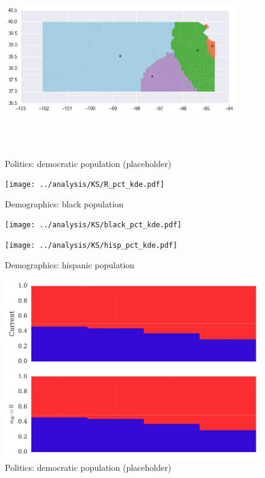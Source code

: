 \begin{figure}[htb!]
\includegraphics[width=4in,height=3in,keepaspectratio]{../maps/KS/static/0_25_after.png}
\end{figure}

\clearpage
\newpage

\begin{figure}[htb!] \centering
\caption{ Politics: democratic population (placeholder)}
\texttt{[image: ../analysis/KS/R\_pct\_kde.pdf]}
\caption{ Demographics: black population }
\texttt{[image: ../analysis/KS/black\_pct\_kde.pdf]}
\caption{ Demographics: hispanic population }
\texttt{[image: ../analysis/KS/hisp\_pct\_kde.pdf]}
\end{figure}

\clearpage
\newpage

\begin{figure}[htb!] \centering
\caption{ Politics: democratic population (placeholder)}
\includegraphics[width=6in]{../analysis/KS/barplot.pdf}
\end{figure}

